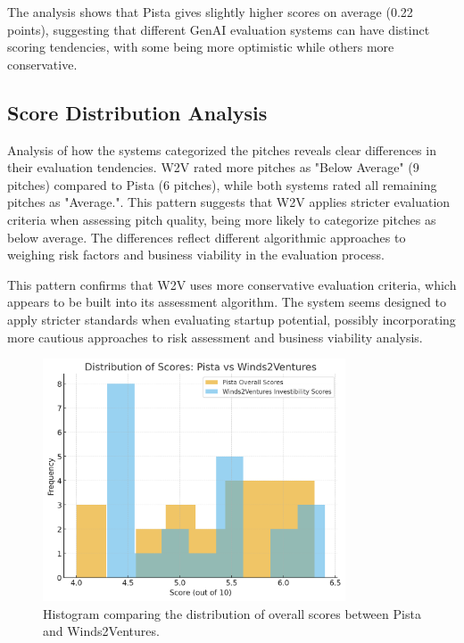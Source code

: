 The analysis shows that Pista gives slightly higher scores on average (0.22 points), suggesting that different GenAI evaluation systems can have distinct scoring tendencies, with some being more optimistic while others more conservative.


\subsection{Score Distribution Analysis}

Analysis of how the systems categorized the pitches reveals clear differences in their evaluation tendencies. W2V rated more pitches as "Below Average" (9 pitches) compared to Pista (6 pitches), while both systems rated all remaining pitches as "Average.". This pattern suggests that W2V applies stricter evaluation criteria when assessing pitch quality, being more likely to categorize pitches as below average. The differences reflect different algorithmic approaches to weighing risk factors and business viability in the evaluation process.

This pattern confirms that W2V uses more conservative evaluation criteria, which appears to be built into its assessment algorithm. The system seems designed to apply stricter standards when evaluating startup potential, possibly incorporating more cautious approaches to risk assessment and business viability analysis.

\begin{figure}[h]
    \centering
    \includegraphics[width=0.8\textwidth]{img/score_histogram.png}
    \caption{Histogram comparing the distribution of overall scores between Pista and Winds2Ventures.}
    \label{fig:score-histogram}
\end{figure}

